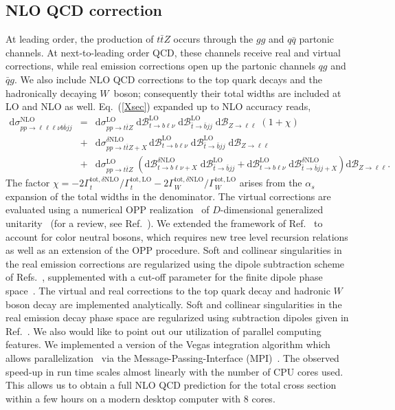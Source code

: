 \documentclass{JHEP3}
\newcommand{\mrm}{\mathrm}
\newcommand{\rd}{\mathrm{d}}
\newcommand{\Br}{\mathcal{B}}
\def\ttbZ{t\bar{t}Z}
\newcommand{\be}{\begin{eqnarray}}
\newcommand{\ee}{\end{eqnarray}}
\begin{document}
\subsection{NLO QCD correction}
At leading order, the production of $\ttbZ$ occurs through the $gg$ and $q\bar{q}$ partonic channels. 
At next-to-leading order QCD, these channels receive real and virtual corrections, while real emission corrections open up the partonic channels $qg$ and $\bar{q}g$. 
We also include NLO QCD corrections to the top quark decays and the hadronically decaying $W$~boson; consequently their total widths are included at LO and NLO as well.
Eq.~(\ref{Xsec}) expanded up to NLO accuracy reads,
\be
  \rd \sigma_{pp\to\ell\ell\ell\nu b \bar{b} jj}^\mrm{NLO} &=& 
  \rd \sigma_{pp\to\ttbZ}^\mrm{LO} \; \rd\Br_{t\to b \ell\nu}^\mrm{LO} \; \rd\Br_{\bar{t} \to \bar{b} jj}^\mrm{LO} \; \rd\Br_{Z\to \ell\ell}
  \; \left( 1 + \chi \right)
  \nonumber \\
  &+&   \rd \sigma_{pp\to\ttbZ+X}^{\delta \mrm{NLO}}  \, \rd\Br_{t\to b \ell\nu}^\mrm{LO} \; \rd\Br_{\bar{t} \to \bar{b} jj}^\mrm{LO} \; \rd\Br_{Z\to \ell\ell}
  \\
  &+&  \rd \sigma_{pp\to\ttbZ}^\mrm{LO} \; \left(  \rd\Br_{t\to b \ell\nu+X}^{\delta\mrm{NLO}} \; \rd\Br_{\bar{t} \to \bar{b} jj}^\mrm{LO} + \rd\Br_{t\to b \ell\nu}^\mrm{LO} \; 
  \rd\Br_{\bar{t} \to \bar{b} jj+X}^{\delta\mrm{NLO}} \right) \rd\Br_{Z\to \ell\ell}
  \nonumber. \label{XsecNLO}
\ee
The factor $\chi= -2 \Gamma_t^{\mrm{tot},\delta\mrm{NLO}}/\Gamma_t^{\mrm{tot,LO}} -2 \Gamma_W^{\mrm{tot},\delta\mrm{NLO}}/\Gamma_W^{\mrm{tot,LO}} $ arises from the $\alpha_s$ expansion
of the total widths in the denominator.
The virtual corrections are evaluated using a numerical OPP realization~\cite{Ossola:2006} of $D$-dimensional generalized unitarity~\cite{Ellis:2007br,Giele:2008ve,Ellis:2008ir} (for a review, see Ref.~\cite{Ellis:2011}).
We extended the framework of Ref.~\cite{Melnikov:2009dn} to account for color neutral bosons,  
which requires new tree level recursion relations as well as an extension of the OPP procedure.
Soft and collinear singularities in the real emission corrections are regularized using the dipole subtraction scheme of Refs.~\cite{Catani:1996vz,Catani:2002hc}, supplemented with a cut-off parameter for the
finite dipole phase space~\cite{Nagy:1998bb,Nagy:2003tz,Bevilacqua:2009zn,Campbell:2010ff}.
The virtual and real corrections to the top quark decay and hadronic $W$ boson decay are implemented analytically. 
Soft and collinear singularities in the real emission decay phase space are regularized using subtraction dipoles given in Ref.~\cite{Melnikov:2011ta}.
We also would like to point out our utilization of parallel computing features. 
We implemented a version of the Vegas integration algorithm which allows parallelization~\cite{pvegas} via the Message-Passing-Interface (MPI)~\cite{mpi-2-standard}. 
The observed speed-up in run time scales almost linearly with the number of CPU cores used. 
This allows us to obtain a full NLO QCD prediction for the total cross section within a few hours on a modern desktop computer with 8 cores.
\end{document}
